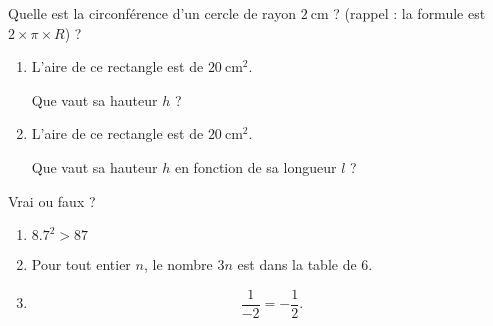 \begin{MentalActivity}

    \begin{mental}
        Quelle est la circonférence d'un cercle de rayon \( \SI{2}{\centi\meter}\) ? (rappel : la formule est \( 2\times\pi\times R\)) ?
    \end{mental}

    \begin{mental}
        \begin{enumerate}
            \item
                L'aire de ce rectangle est de \(\SI{20}{\centi\meter\squared}\).
        \begin{center}
           
        \end{center}
        Que vaut sa hauteur \( h\) ?
            \item
                L'aire de ce rectangle est de \(\SI{20}{\centi\meter\squared}\).
                \begin{center}
                    
                \end{center}
                Que vaut sa hauteur \( h\) en fonction de sa longueur \( l\) ?
        \end{enumerate}
    \end{mental}

    \begin{mental}
        Vrai ou faux ?
        \begin{enumerate}
            \item
                \( 8.7^2>87\)
            \item
                Pour tout entier \( n\), le nombre \( 3n\) est dans la table de \( 6\).
            \item
                \begin{equation}
                    \frac{1}{ -2 }=-\frac{1}{ 2 }.
                \end{equation}
        \end{enumerate}
    \end{mental}
    
\end{MentalActivity}
